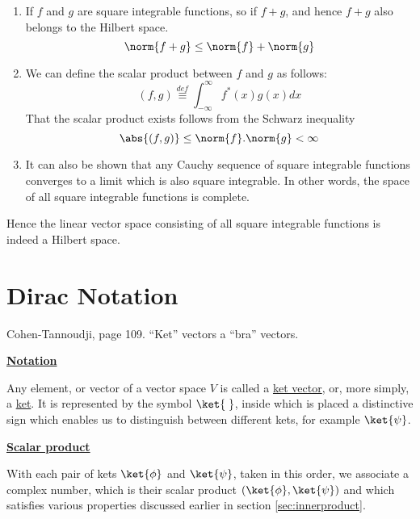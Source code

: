 \begin{enumerate}
\item  If $f$ and $g$ are square integrable functions, so if $f+g$, and hence $f+g$ also belongs to the Hilbert space.
$$\norm{f+g} \leq \norm{f} + \norm{g}$$

\item  We can define the scalar product between $f$ and $g$ as follows:
$$(f,g) \stackrel{def}{\equiv} \int_{-\infty}^{\infty}f^{\ast}(x)g(x)dx$$
That the scalar product exists follows from the Schwarz inequality
$$\abs{(f,g)} \leq \norm{f}.\norm{g} < \infty$$

\item  It can also be shown that any Cauchy sequence of square integrable functions converges to a limit which is also square integrable. In other words, the space of all square integrable functions is complete.
\end{enumerate}

Hence the linear vector space consisting of all square integrable functions is indeed a Hilbert space.



\section{Dirac Notation}
Cohen-Tannoudji, page 109. \newline
``Ket'' vectors a ``bra'' vectors. 
\vspace{3mm}

\textbf{\underline{Notation}}

\hspace{5mm}Any element, or vector of a vector space $V$ is called a \underline{ket vector}, or, more simply, a \underline{ket}. It is represented by the symbol $\ket{\hspace{1mm}}$, inside which is placed a distinctive sign which enables us to distinguish between different kets, for example $\ket{\psi}$.

\vspace{3mm}

\textbf{\underline{Scalar product}}

\vspace{1mm}

\hspace{5mm}With each pair of kets $\ket{\phi}$ and $\ket{\psi}$, taken in this order, we associate a complex number, which is their scalar product $(\ket{\phi}, \ket{\psi})$ and which satisfies various properties discussed earlier in section 
\ref{sec:innerproduct}.

